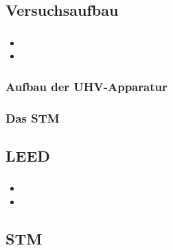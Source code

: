 \documentclass{beamer}
\begin{document}
\subsection[Versuchsaufbau]{Versuchsaufbau}

\begin{frame}
\frametitle{}
\begin{itemize}
  \item
  \item
\end{itemize}
\end{frame}

\begin{frame}
\frametitle{Aufbau der UHV-Apparatur}
\begin{figure}[H]
\centering
\sffamily

\end{figure}
\end{frame}

\begin{frame}
\frametitle{Das STM}
\begin{figure}[H]
\centering
\sffamily

\end{figure}
\end{frame}



\subsection[Ergebnisse]{LEED}

\begin{frame}
\frametitle{}
\begin{itemize}
  \item
  \item
\end{itemize}
\end{frame}



\subsection[Ergebnisse]{STM}
\end{document}
